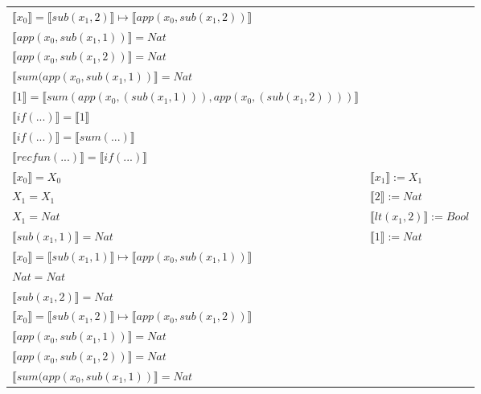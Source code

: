 \begin{exercise}
\begin{description}
\begin{center}
\begin{longtable}{ | l | l | }
                        $ \llbracket x_0 \rrbracket = \llbracket sub(x_1,2) \rrbracket \mapsto  \llbracket app(x_0, sub(x_1,2)) \rrbracket$ & \\
                        $ \llbracket app(x_0, sub(x_1,1)) \rrbracket = Nat$ & \\
                        $ \llbracket app(x_0, sub(x_1,2)) \rrbracket = Nat$ & \\
                        $ \llbracket sum(app(x_0, sub(x_1,1)) \rrbracket = Nat$ & \\
                        $ \llbracket 1 \rrbracket =  \llbracket sum(app(x_0, (sub(x_1,1))), app(x_0, (sub(x_1,2)))) \rrbracket$ & \\
                        $ \llbracket if(...) \rrbracket =  \llbracket 1 \rrbracket$ & \\
                        $ \llbracket if(...) \rrbracket =  \llbracket sum(...) \rrbracket$ & \\
                        $ \llbracket recfun(...) \rrbracket =  \llbracket if(...) \rrbracket$ & \\
                    \hline
                        $ \llbracket x_0 \rrbracket = X_0$ & $ \llbracket x_1 \rrbracket := X_1$ \\
                        $X_1 = X_1$ & $ \llbracket 2 \rrbracket := Nat$ \\
                        $X_1 = Nat$ & $ \llbracket lt(x_1 , 2) \rrbracket := Bool$ \\
                        $ \llbracket sub(x_1,1) \rrbracket = Nat$ & $ \llbracket 1 \rrbracket := Nat$ \\
                        $ \llbracket x_0 \rrbracket =  \llbracket sub(x_1,1) \rrbracket \mapsto  \llbracket app(x_0, sub(x_1,1)) \rrbracket$ & \\
                        $Nat = Nat$ & \\
                        $ \llbracket sub(x_1,2) \rrbracket = Nat$ & \\
                        $ \llbracket x_0 \rrbracket = \llbracket sub(x_1,2) \rrbracket \mapsto  \llbracket app(x_0, sub(x_1,2)) \rrbracket$ & \\
                        $ \llbracket app(x_0, sub(x_1,1)) \rrbracket = Nat$ & \\
                        $ \llbracket app(x_0, sub(x_1,2)) \rrbracket = Nat$ & \\
                        $ \llbracket sum(app(x_0, sub(x_1,1)) \rrbracket = Nat$ & \\

\end{longtable}
\end{center}
\end{description}
\end{exercise}
